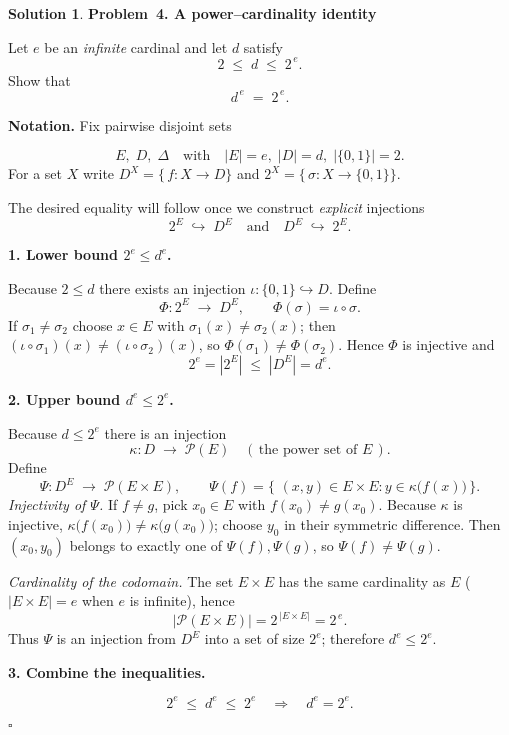 \documentclass[12pt]{article}
\theoremstyle{definition} %
\newtheorem{solution}{Solution}
\theoremstyle{plain} %
\begin{document}
\begin{solution}
  \textbf{Problem 4.  A power–cardinality identity}  
  
  Let \(e\) be an \emph{infinite} cardinal and let \(d\) satisfy
  \[
     2 \;\le\; d \;\le\; 2^{\,e}.
  \]
  Show that
  \[
        d^{\,e} \;=\; 2^{\,e}.
  \]
  
  \bigskip
  \textbf{Notation.}
  Fix pairwise disjoint sets  
  
  \[
        E,\;D,\;\Delta
        \quad\text{with}\quad
        |E| = e,\;
        |D| = d,\;
        |\{0,1\}| = 2.
  \]
  For a set \(X\) write \(D^{X} = \{\,f:X\to D\}\) and
  \(2^{X} = \{\,\sigma:X\to\{0,1\}\}\).
  
  \medskip
  The desired equality will follow once we construct \emph{explicit}
  injections
  \[
        2^{E}\;\hookrightarrow\; D^{E}
        \quad\text{and}\quad
        D^{E}\;\hookrightarrow\; 2^{E}.
  \]
  
  \bigskip
  \textbf{1.  Lower bound \(2^{e}\le d^{e}\).}
  
  Because \(2\le d\) there exists an injection
  \(\iota:\{0,1\}\hookrightarrow D\).
  Define
  \[
      \Phi:2^{E}\;\longrightarrow\; D^{E},
      \qquad
      \Phi(\sigma)=\iota\circ\sigma.
  \]
  If \(\sigma_1\neq\sigma_2\) choose \(x\in E\) with
  \(\sigma_1(x)\neq\sigma_2(x)\); then
  \((\iota\circ\sigma_1)(x)\neq(\iota\circ\sigma_2)(x)\), so
  \(\Phi(\sigma_1)\neq\Phi(\sigma_2)\).
  Hence \(\Phi\) is injective and
  \[
        2^{e}=|2^{E}|\;\le\;|D^{E}|=d^{e}.
  \]
  
  \bigskip
  \textbf{2.  Upper bound \(d^{e}\le 2^{e}\).}
  
  Because \(d\le 2^{e}\) there is an injection
  \[
       \kappa:D\;\longrightarrow\; \mathcal P(E)\quad
       (\,\text{the power set of }E\,).
  \]
  Define
  \[
       \Psi:D^{E}\;\longrightarrow\; \mathcal P(E\times E),
       \qquad
       \Psi(f)=
       \bigl\{\,\,(x,y)\in E\times E : y\in\kappa\!\bigl(f(x)\bigr)\,\bigr\}.
  \]
  \emph{Injectivity of \(\Psi\).}
  If \(f\neq g\), pick \(x_0\in E\) with \(f(x_0)\neq g(x_0)\).
  Because \(\kappa\) is injective,
  \(\kappa\!\bigl(f(x_0)\bigr)\neq\kappa\!\bigl(g(x_0)\bigr)\); choose
  \(y_0\) in their symmetric difference.
  Then \((x_0,y_0)\) belongs to exactly one of
  \(\Psi(f),\Psi(g)\), so \(\Psi(f)\neq\Psi(g)\).
  
  \smallskip
  \emph{Cardinality of the codomain.}
  The set \(E\times E\) has the same cardinality as \(E\)
  (\(|E\times E|=e\) when \(e\) is infinite), hence
  \[
        \bigl|\mathcal P(E\times E)\bigr|
        = 2^{\,|E\times E|}
        = 2^{\,e}.
  \]
  Thus \(\Psi\) is an injection from \(D^{E}\) into a set of size
  \(2^{e}\); therefore \(d^{e}\le 2^{e}\).
  
  \bigskip
  \textbf{3.  Combine the inequalities.}
  
  \[
        2^{e}\;\le\; d^{e}\;\le\; 2^{e}
        \quad\Longrightarrow\quad
        d^{e}=2^{e}.
  \]
  
  \medskip\noindent
  \(\square\)
  \end{solution}
\end{document}
